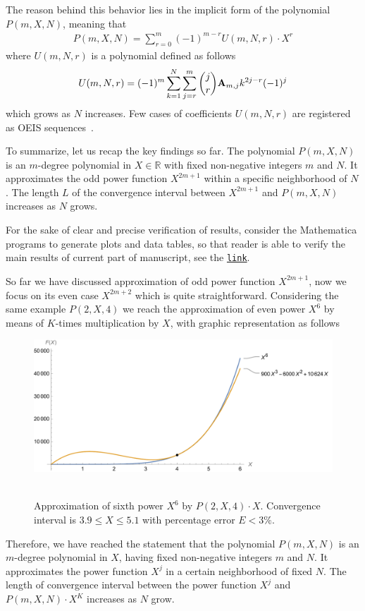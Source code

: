 The reason behind this behavior lies in the implicit form of the polynomial $P(m,X,N)$,
meaning that
\begin{align*}
    P(m,X,N) = \sum_{r=0}^{m} (-1)^{m-r} U(m, N, r) \cdot X^{r}
\end{align*}
where $U(m, N, r)$ is a polynomial defined as follows
\begin{align*}
    U(m, N, r) = (-1)^m \sum_{k=1}^{N} \sum_{j=r}^{m} \binom{j}{r} {\mathbf{A}} \sb{m,j} k^{2j-r} (-1)^j
\end{align*}
which grows as $N$ increases.
Few cases of coefficients $U(m, N, r)$ are registered as OEIS sequences~\cite{
    oeis_coefficients_u_m_l_k_defined_by_polynomial_identity_1,
    oeis_coefficients_u_m_l_k_defined_by_polynomial_identity_2,
    oeis_coefficients_u_m_l_k_defined_by_polynomial_identity_3}.

To summarize, let us recap the key findings so far.
The polynomial $P(m,X,N)$ is an $m$-degree polynomial in $X \in \mathbb{R}$ with fixed non-negative integers $m$ and $N$.
It approximates the odd power function $X^{2m+1}$ within a specific neighborhood of $N$.
The length $L$ of the convergence interval between $X^{2m+1}$ and $P(m,X,N)$ increases as $N$ grows.

For the sake of clear and precise verification of results, consider the Mathematica programs to generate
plots and data tables, so that reader is able to verify the main results of current part of manuscript,
see the \href{https://gist.github.com/kolosovpetro/2b5c55094c66b8d6a97b9798be9a8dec}{\texttt{link}}.

So far we have discussed approximation of odd power function $X^{2m+1}$, now we focus on its even case $X^{2m+2}$
which is quite straightforward.
Considering the same example $P(2, X, 4)$ we reach the approximation of even power $X^6$
by means of $K$-times multiplication by $X$, with graphic representation as follows
\begin{figure}[H]
    \centering
    \includegraphics[width=1\textwidth]{sections/images/07_plot_of_6th_power_with_p_2_4_times_x}
    ~\caption{Approximation of sixth power $X^6$ by $P(2, X, 4) \cdot X$.
    Convergence interval is $3.9 \leq X \leq 5.1$ with percentage error $E < 3\%$.
    }\label{fig:07_plot_of_6th_power_with_p_2_4_times_x}
\end{figure}
Therefore, we have reached the statement that
the polynomial $P(m,X,N)$ is an $m$-degree polynomial in $X$, having fixed non-negative
integers $m$ and $N$.
It approximates the power function $X^{j}$ in a certain neighborhood of fixed $N$.
The length of convergence interval between the power function $X^j$ and $P(m,X,N) \cdot X^K$ increases as $N$ grow.
